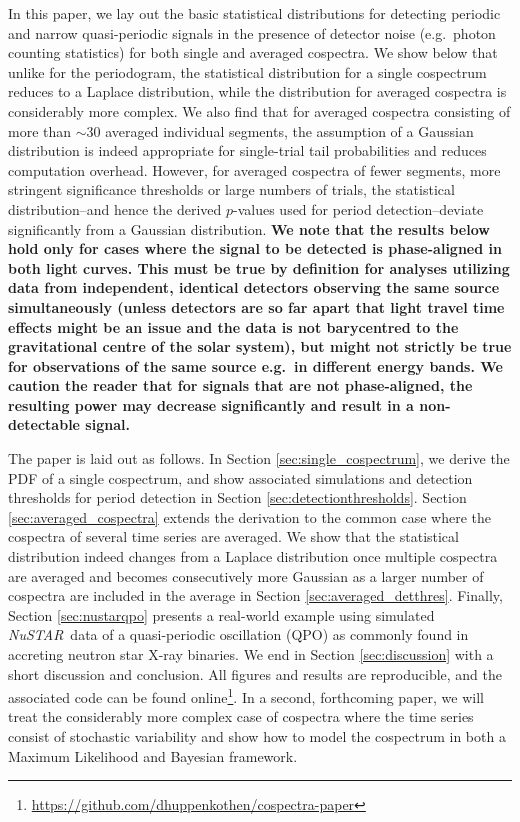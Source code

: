 \documentclass[12pt]{emulateapj}
\newcommand{\project}[1]{\textsl{#1}}
\newcommand{\nustar}{\project{NuSTAR}\xspace}
\begin{document}
In this paper, we lay out the basic statistical distributions for detecting periodic and narrow quasi-periodic signals in the presence of detector noise (e.g.\ photon counting statistics) for both single and averaged cospectra. We show below that unlike for the periodogram, the statistical distribution for a single cospectrum reduces to a Laplace distribution, while the distribution for averaged cospectra is considerably more complex. We also find that for averaged cospectra consisting of more than $\sim$30 averaged individual segments, the assumption of a Gaussian distribution is indeed appropriate for single-trial tail probabilities and reduces computation overhead. However, for averaged cospectra of fewer segments, more stringent significance thresholds or large numbers of trials, the statistical distribution--and hence the derived $p$-values used for period detection--deviate significantly from a Gaussian distribution. \textbf{We note that the results below hold only for cases where the signal to be detected is phase-aligned in both light curves. This must be true by definition for analyses utilizing data from independent, identical detectors observing the same source simultaneously (unless detectors are so far apart that light travel time effects might be an issue and the data is not barycentred to the gravitational centre of the solar system), but might not strictly be true for observations of the same source e.g.\ in different energy bands. We caution the reader that for signals that are not phase-aligned, the resulting power may decrease significantly and result in a non-detectable signal.}

The paper is laid out as follows. In Section \ref{sec:single_cospectrum}, we derive the PDF of a single cospectrum, and show associated simulations and detection thresholds for period detection in Section \ref{sec:detectionthresholds}. Section \ref{sec:averaged_cospectra} extends the derivation to the common case where the cospectra of several time series are averaged. We show that the statistical distribution indeed changes from a Laplace distribution once multiple cospectra are averaged and becomes consecutively more Gaussian as a larger number of cospectra are included in the average in Section \ref{sec:averaged_detthres}. Finally, Section \ref{sec:nustarqpo} presents a real-world example using simulated \nustar\ data of a quasi-periodic oscillation (QPO) as commonly found in accreting neutron star X-ray binaries. We end in Section \ref{sec:discussion} with a short discussion and conclusion. All figures and results are reproducible, and the associated code can be found online\footnote{\url{https://github.com/dhuppenkothen/cospectra-paper}}.
In a second, forthcoming paper, we will treat the considerably more complex case of cospectra where the time series consist of stochastic variability and show how to model the cospectrum in both a Maximum Likelihood and Bayesian framework.
\end{document}
